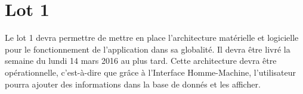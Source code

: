 \section{Lot 1}
	Le lot 1 devra permettre de mettre en place l'architecture matérielle et logicielle pour le fonctionnement de l'application dans sa globalité. Il devra être livré la semaine du lundi 14 mars 2016 au plus tard. Cette architecture devra être opérationnelle, c'est-à-dire que grâce à l'Interface Homme-Machine, l'utilisateur pourra ajouter des informations dans la base de donnés et les afficher.  
